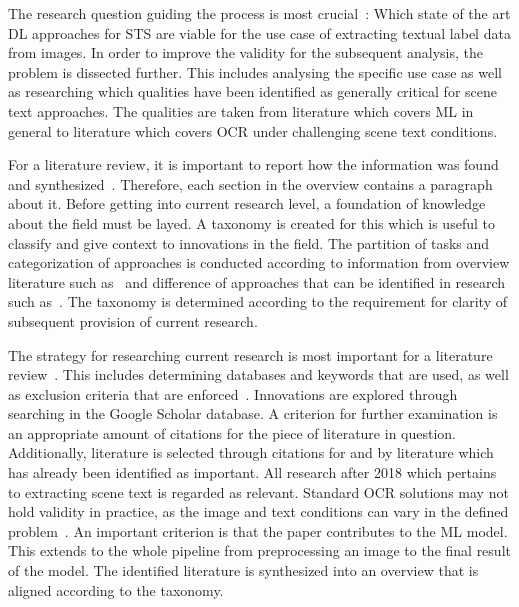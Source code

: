 The research question guiding the process is most crucial~\citep{snyder_literature_2019}:
Which state of the art \ac{DL} approaches for \ac{STS} are viable for the use case of extracting
textual label data from images.
In order to improve the validity for the subsequent analysis, the problem is dissected further.
This includes analysing the specific use case as well as researching which qualities have been
identified as generally critical for scene text approaches.
The qualities are taken from literature which covers \ac{ML} in general to literature
which covers \ac{OCR} under challenging scene text conditions.

For a literature review, it is important to report how the information was found and
synthesized~\citep{torraco_writing_2005}.
Therefore, each section in the overview contains a paragraph about it.
Before getting into current research level, a foundation of knowledge about the field must be layed.
A taxonomy is created for this which is useful to classify and give context to innovations in the
field.
The partition of tasks and categorization of approaches is conducted according to information from
overview literature such as~\cite{long_scene_2021,chen_text_2021,cong_comparative_2019} and
difference of approaches that can be identified in research such
as~\cite{qiao_text_2021,sheng_centripetaltext_2021,liu_accurate_2020,deng_pixellink_2018}.
The taxonomy is determined according to the requirement for clarity of subsequent provision of
current research.

The strategy for researching current research is most important for a literature
review~\citep{snyder_literature_2019}.
This includes determining databases and keywords that are used, as well as exclusion criteria
that are enforced~\citep{torraco_writing_2005}.
Innovations are explored through searching in the Google Scholar database.
A criterion for further examination is an appropriate amount of citations for the piece of literature
in question.
Additionally, literature is selected through citations for and by literature which has already been
identified as important.
All research after 2018 which pertains to extracting scene text is regarded as relevant.
Standard \ac{OCR} solutions may not hold validity in practice, as the image and text conditions can
vary in the defined problem~\citep{chen_text_2021}.
An important criterion is that the paper contributes to the \ac{ML} model.
This extends to the whole pipeline from preprocessing an image to the final result of the model.
The identified literature is synthesized into an overview that is aligned according to the taxonomy.

